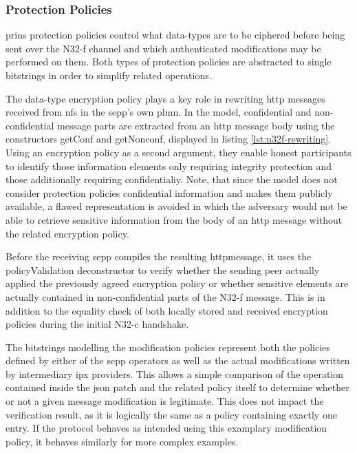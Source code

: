 \subsubsection{Protection Policies}

\gls{prins} protection policies control what data-types are to be ciphered before being sent over the N32-f channel and which authenticated modifications may be performed on them.
Both types of protection policies are abstracted to single bitstrings in order to simplify related operations.

The data-type encryption policy plays a key role in rewriting \gls{http} messages received from \glspl{nf} in the \gls{sepp}'s own \gls{plmn}.
In the model, confidential and non-confidential message parts are extracted from an \gls{http} message body using the constructors {\sffamily getConf} and {\sffamily getNonconf}, displayed in listing \ref{lst:n32f-rewriting}.
Using an encryption policy as a second argument, they enable honest participants to identify those information elements only requiring integrity protection and those additionally requiring confidentialiy.
Note, that since the model does not consider protection policies confidential information and makes them publicly available, a flawed representation is avoided in which the adversary would not be able to retrieve sensitive information from the body of an \gls{http} message without the related encryption policy.

Before the receiving \gls{sepp} compiles the resulting \gls{http}message, it uses the {\sffamily policyValidation} deconstructor to verify whether the sending peer actually applied the previously agreed encryption policy or whether sensitive elements are actually contained in non-confidential parts of the N32-f message.
This is in addition to the equality check of both locally stored and received encryption policies during the initial N32-c handshake.

The bitstrings modelling the modification policies represent both the policies defined by either of the \gls{sepp} operators as well as the actual modifications written by intermediary \gls{ipx} providers.
This allows a simple comparison of the operation contained inside the \gls{json} patch and the related policy itself to determine whether or not a given message modification is legitimate.
This does not impact the verification result, as it is logically the same as a policy containing exactly one entry.
If the protocol behaves as intended using this examplary modification policy, it behaves similarly for more complex examples.

